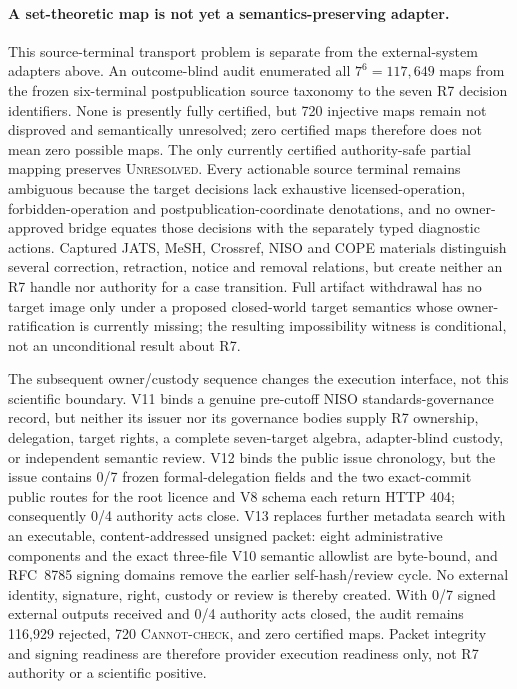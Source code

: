 \paragraph{A set-theoretic map is not yet a semantics-preserving adapter.}
This source-terminal transport problem is separate from the external-system
adapters above. An outcome-blind audit enumerated all $7^6=117{,}649$ maps from the frozen
six-terminal postpublication source taxonomy to the seven R7 decision
identifiers. None is presently fully certified, but 720 injective maps remain
not disproved and semantically unresolved; zero certified maps therefore does
not mean zero possible maps. The only currently certified authority-safe
partial mapping preserves \textsc{Unresolved}. Every actionable source
terminal remains ambiguous because the target decisions lack exhaustive
licensed-operation, forbidden-operation and postpublication-coordinate
denotations, and no owner-approved bridge equates those decisions with the
separately typed diagnostic actions. Captured JATS, MeSH, Crossref, NISO and
COPE materials distinguish several correction, retraction, notice and removal
relations, but create neither an R7 handle nor authority for a case transition.
Full artifact withdrawal has no target image only under a proposed closed-world
target semantics whose owner-ratification is currently missing; the resulting
impossibility witness is conditional, not an unconditional result about R7.

The subsequent owner/custody sequence changes the execution interface, not this
scientific boundary. V11 binds a genuine pre-cutoff NISO standards-governance
record, but neither its issuer nor its governance bodies supply R7 ownership,
delegation, target rights, a complete seven-target algebra, adapter-blind
custody, or independent semantic review. V12 binds the public issue chronology,
but the issue contains 0/7 frozen formal-delegation fields and the two
exact-commit public routes for the root licence and V8 schema each return HTTP
404; consequently 0/4 authority acts close. V13 replaces further metadata
search with an executable, content-addressed unsigned packet: eight
administrative components and the exact three-file V10 semantic allowlist are
byte-bound, and RFC~8785 signing domains remove the earlier self-hash/review
cycle. No external identity, signature, right, custody or review is thereby
created. With 0/7 signed external outputs received and 0/4 authority acts
closed, the audit remains 116,929 rejected, 720 \textsc{Cannot-check}, and zero
certified maps. Packet integrity and signing readiness are therefore provider
execution readiness only, not R7 authority or a scientific positive.

